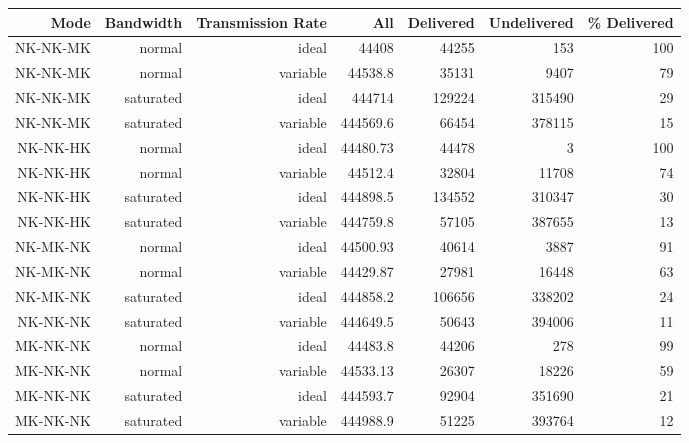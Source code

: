 \begin{landscape}
\begin{table}[htbp]
    \begin{tabular}{rrrrrrr}

    \toprule
    Mode  & Bandwidth & Transmission Rate & All   & Delivered & Undelivered & \% Delivered \\
    \midrule
\rowcolor{Gray}    
    NK-NK-MK & normal & ideal & 44408 & 44255 & 153   & 100 \\
\rowcolor{Gray}
    NK-NK-MK & normal & variable & 44538.8 & 35131 & 9407  & 79 \\
\rowcolor{Gray}
    NK-NK-MK & saturated & ideal & 444714 & 129224 & 315490 & 29 \\
\rowcolor{Gray}
    NK-NK-MK & saturated & variable & 444569.6 & 66454 & 378115 & 15 \\
    NK-NK-HK & normal & ideal & 44480.73 & 44478 & 3     & 100 \\
    NK-NK-HK & normal & variable & 44512.4 & 32804 & 11708 & 74 \\
    NK-NK-HK & saturated & ideal & 444898.5 & 134552 & 310347 & 30 \\
    NK-NK-HK & saturated & variable & 444759.8 & 57105 & 387655 & 13 \\
\rowcolor{Gray}
    NK-MK-NK & normal & ideal & 44500.93 & 40614 & 3887  & 91 \\
\rowcolor{Gray}
    NK-MK-NK & normal & variable & 44429.87 & 27981 & 16448 & 63 \\
\rowcolor{Gray}
    NK-MK-NK & saturated & ideal & 444858.2 & 106656 & 338202 & 24 \\
\rowcolor{Gray}
    NK-NK-NK & saturated & variable & 444649.5 & 50643 & 394006 & 11 \\
    MK-NK-NK & normal & ideal & 44483.8 & 44206 & 278   & 99 \\
    MK-NK-NK & normal & variable & 44533.13 & 26307 & 18226 & 59 \\
    MK-NK-NK & saturated & ideal & 444593.7 & 92904 & 351690 & 21 \\
    MK-NK-NK & saturated & variable & 444988.9 & 51225 & 393764 & 12 \\

\end{tabular}
\end{table}
\end{landscape}

